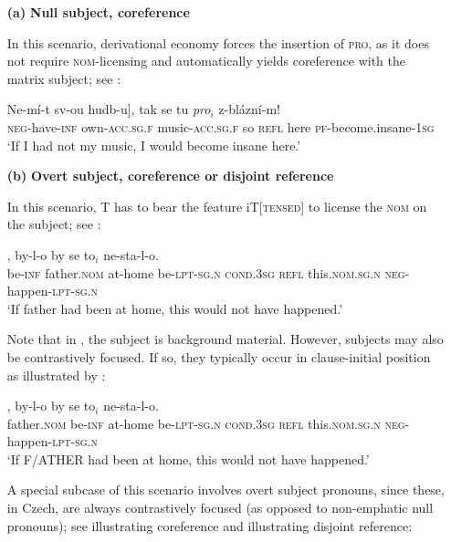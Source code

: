 \documentclass[output=paper,colorlinks,citecolor=brown,
modfonts,newtxmath
]{langscibook}
\begin{document}
\begin{itemize}
\item[\textbf{(a)}] \textbf{Null subject, coreference}

In this scenario, derivational economy forces the insertion of \textsc{pro}, as it does not require \textsc{nom}-licensing and automatically yields coreference with the matrix subject; see :

\ea\label{ex:music3}
\gll {[\textsc{pro}$_i$} Ne-mí-t sv-ou hudb-u], tak se tu {\textit{pro}$_i$} z-blázní-m!\\
     {} \textsc{neg}-have-\textsc{inf} own-\textsc{acc.sg.f} music-\textsc{acc.sg.f} so \textsc{refl} here {} \textsc{pf}-{become.insane}-\textsc{1sg}\\
\glt `If I had not my music, I would become insane here.'
\z


\item[\textbf{(b)}] \textbf{Overt subject, coreference or disjoint reference}

In this scenario, T has to bear the feature iT[\textsc{tensed}] to license the \textsc{nom} on the subject; see :

\ea\label{ex:father3}
, by-l-o by se to$_i$ ne-sta-l-o.\\
     {} be-\textsc{inf} father.\textsc{nom} {at-home} be-\textsc{lpt-sg.n} \textsc{cond.3sg} \textsc{refl} this.\textsc{nom.sg.n} \textsc{neg}-happen-\textsc{lpt-sg.n}\\
\glt `If father had been at home, this would not have happened.'
\z

\noindent Note that in , the subject is background material. However, subjects may also be contrastively focused. If so, they typically occur in clause-initial position as illustrated by :

\ea\label{ex:father4}
, by-l-o by se to$_i$ ne-sta-l-o.\\
     {} father.\textsc{nom} be-\textsc{inf} {at-home} be-\textsc{lpt-sg.n} \textsc{cond.3sg} \textsc{refl} this.\textsc{nom.sg.n} \textsc{neg}-happen-\textsc{lpt-sg.n}\\
\glt `If F/ATHER had been at home, this would not have happened.'
\z

\noindent A special subcase of this scenario involves overt subject pronouns, since these, in Czech, are always contrastively focused (as opposed to non-emphatic null pronouns); see  illustrating coreference and  illustrating disjoint reference:


\end{itemize}
\end{document}
